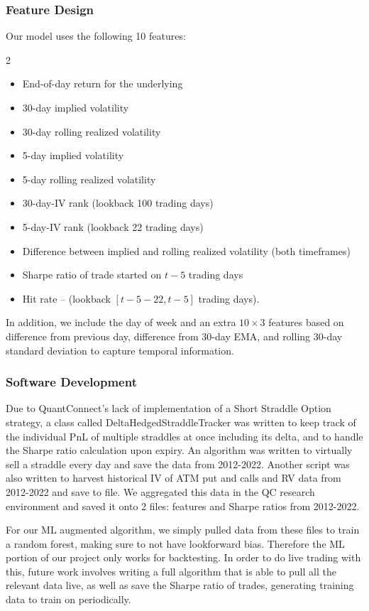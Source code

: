 \documentclass[10pt]{article}
\theoremstyle{definition}
\begin{document}
\subsubsection*{Feature Design}
Our model uses the following 10 features:
\begin{multicols}{2}
\begin{itemize}
  \setlength\itemsep{0em}
	\item End-of-day return for the underlying
	\item 30-day implied volatility
 	\item 30-day rolling realized volatility
    \item 5-day implied volatility
    \item 5-day rolling realized volatility
 	\item 30-day-IV rank (lookback 100 trading days)
    \item 5-day-IV rank (lookback 22 trading days)
    \item Difference between implied and rolling realized volatility (both timeframes)
    \item Sharpe ratio of trade started on $t-5$ trading days
	\item Hit rate – (lookback $[t- 5 - 22, t - 5]$ trading days).
\end{itemize}
\end{multicols}
In addition, we include the day of week and an extra $10 \times 3$ features based on difference from previous day, difference from 30-day EMA, and rolling 30-day standard deviation to capture temporal information.

\subsubsection*{Software Development}
Due to QuantConnect's lack of implementation of a Short Straddle Option strategy, a class called DeltaHedgedStraddleTracker was written to keep track of the individual PnL of multiple straddles at once including its delta, and to handle the Sharpe ratio calculation upon expiry. An algorithm was written to virtually sell a straddle every day and save the data from 2012-2022. Another script was also written to harvest historical IV of ATM put and calls and RV data from 2012-2022 and save to file. We aggregated this data in the QC research environment and saved it onto 2 files: features and Sharpe ratios from 2012-2022.

For our ML augmented algorithm, we simply pulled data from these files to train a random forest, making sure to not have lookforward bias. Therefore the ML portion of our project only works for backtesting. In order to do live trading with this, future work involves writing a full algorithm that is able to pull all the relevant data live, as well as save the Sharpe ratio of trades, generating training data to train on periodically.
\end{document}
